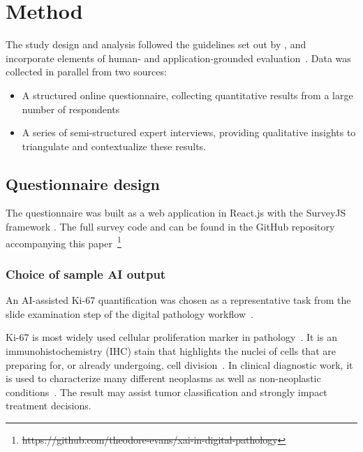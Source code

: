 \documentclass[final,5p,times,twocolumn,hyphens]{elsarticle}
\providecommand{\DIFaddtex}[1]{{\protect\color{blue}\uwave{#1}}} %
\providecommand{\DIFdeltex}[1]{{\protect\color{red}\sout{#1}}}                      %
\providecommand{\DIFaddbegin}{} %
\providecommand{\DIFaddend}{} %
\providecommand{\DIFdelbegin}{} %
\providecommand{\DIFdelend}{} %
\providecommand{\DIFadd}[1]{\texorpdfstring{\DIFaddtex{#1}}{#1}} %
\providecommand{\DIFdel}[1]{\texorpdfstring{\DIFdeltex{#1}}{}} %
\newcommand{\DIFscaledelfig}{0.5}
\newlength{\DIFdelgraphicswidth} %
\newlength{\DIFdelgraphicsheight} %
\newcommand{\DIFaddincludegraphics}[2][]{{\color{blue}\fbox{\DIFOincludegraphics[#1]{#2}}}} %
\newcommand{\DIFdelincludegraphics}[2][]{%
\sbox{\DIFdelgraphicsbox}{\DIFOincludegraphics[#1]{#2}}%
\settoboxwidth{\DIFdelgraphicswidth}{\DIFdelgraphicsbox} %
\settoboxtotalheight{\DIFdelgraphicsheight}{\DIFdelgraphicsbox} %
\scalebox{\DIFscaledelfig}{%
\parbox[b]{\DIFdelgraphicswidth}{\usebox{\DIFdelgraphicsbox}\\[-\baselineskip] \rule{\DIFdelgraphicswidth}{0em}}\llap{\resizebox{\DIFdelgraphicswidth}{\DIFdelgraphicsheight}{%
\setlength{\unitlength}{\DIFdelgraphicswidth}%
\begin{picture}(1,1)%
\thicklines\linethickness{2pt} %
{\color[rgb]{1,0,0}\put(0,0){\framebox(1,1){}}}%
{\color[rgb]{1,0,0}\put(0,0){\line( 1,1){1}}}%
{\color[rgb]{1,0,0}\put(0,1){\line(1,-1){1}}}%
\end{picture}%
}\hspace*{3pt}}} %
} %
\DeclareRobustCommand{\DIFaddbegin}{\DIFOaddbegin \let\includegraphics\DIFaddincludegraphics} %
\DeclareRobustCommand{\DIFaddend}{\DIFOaddend \let\includegraphics\DIFOincludegraphics} %
\DeclareRobustCommand{\DIFdelbegin}{\DIFOdelbegin \let\includegraphics\DIFdelincludegraphics} %
\DeclareRobustCommand{\DIFdelend}{\DIFOaddend \let\includegraphics\DIFOincludegraphics} %
\begin{document}
\section{Method}
\label{sec:method}

The study design and analysis followed the guidelines set out by \citet{runeson_guidelines_2008}, and incorporate elements of human- and application-grounded evaluation~\cite{doshi2017towards}. Data was collected in parallel from two sources:

\begin{itemize}
    \item A structured online questionnaire, collecting quantitative results from a large number of respondents
    \item A series of semi-structured expert interviews, providing qualitative insights to triangulate and contextualize these results. 
\end{itemize}

\subsection{Questionnaire design}

The questionnaire was built as a web application in React.js with the SurveyJS framework \cite{devsoft-baltic-ou-2021}. The full survey code and can be found in the GitHub repository accompanying this paper~\DIFdelbegin \footnote{\DIFdel{https://github.com/theodore-evans/xai-in-digital-pathology}}
\addtocounter{footnote}{-1}%
\DIFdelend \DIFaddbegin \DIFadd{\mbox{%
\cite{Evans_xAI_in_Digital_2022}}\hspace{0pt}%
.
}\DIFaddend 

\subsubsection{Choice of sample AI output}

An AI-assisted Ki-67 quantification was chosen as a representative task from the slide examination step of the digital pathology workflow~\cite{Kargl-et-al:2020:PathoWorkflows}.

Ki-67 is most widely used cellular proliferation marker in pathology~\cite{li2015ki67}. It is an immunohistochemistry (IHC) stain that highlights the nuclei of cells that are preparing for, or already undergoing, cell division~\cite{scholzen2000ki}. In clinical diagnostic work, it is used to characterize many different neoplasms as well as non-neoplastic conditions~\cite{nadler2013ki}. The result may assist tumor classification and strongly impact treatment decisions. 
\end{document}
